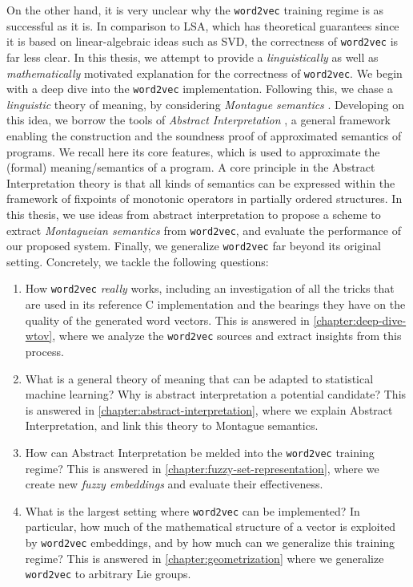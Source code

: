 \documentclass[11pt]{book}
\begin{document}
On the other hand, it is very unclear why the \texttt{word2vec} training regime
is as successful as it is. 
In comparison to LSA, which has theoretical guarantees
since it is based on linear-algebraic ideas such as SVD, the correctness of
\texttt{word2vec} is far less clear. In this thesis, we 
attempt to provide a
\emph{linguistically} as well as \emph{mathematically} motivated explanation
for the correctness of \texttt{word2vec}. We begin with a deep dive into the \texttt{word2vec}
implementation. Following this, we chase a \emph{linguistic} theory of meaning,
by considering \emph{Montague semantics} \cite{sep-montague-semantics}. Developing on this idea, we borrow the tools of
\emph{Abstract Interpretation} \cite{cousout1996abstract}, a general framework enabling the construction
and the soundness proof of approximated semantics of programs. We
recall here its core features, which is used to approximate the (formal)
meaning/semantics of a program.  A core principle in the Abstract
Interpretation theory is that all kinds of semantics can be expressed within
the framework of fixpoints of monotonic operators in partially ordered structures.
In this thesis, we use ideas from abstract interpretation to propose a scheme
to extract \emph{Montagueian semantics} from \texttt{word2vec}, and evaluate
the performance of our proposed system. Finally, we generalize
\texttt{word2vec} far beyond its original setting. Concretely, we tackle the
following questions:

\begin{enumerate}
    \item How \texttt{word2vec} \emph{really} works, including an
        investigation of all the tricks that are used in its reference C
        implementation and the bearings they have on the quality of the
        generated word vectors. This is answered in \autoref{chapter:deep-dive-wtov},
        where we analyze the \texttt{word2vec} sources and extract insights from this process.
    \item What is a general theory of meaning that can be adapted to
        statistical machine learning? Why is abstract interpretation a
        potential candidate? This is answered in \autoref{chapter:abstract-interpretation},
        where we explain Abstract Interpretation, and link this theory to Montague semantics.
    \item How can Abstract Interpretation be melded into the \texttt{word2vec}
        training regime? This is answered in
        \autoref{chapter:fuzzy-set-representation}, where we create new
        \emph{fuzzy embeddings} and evaluate their effectiveness.
    \item What is the largest setting where \texttt{word2vec} can be
        implemented? In particular, how much of the mathematical structure of a
        vector is exploited by \texttt{word2vec} embeddings, and by how much
        can we generalize this training regime? This is answered in
        \autoref{chapter:geometrization} where we generalize \texttt{word2vec} to arbitrary Lie groups.
\end{enumerate}
\end{document}
